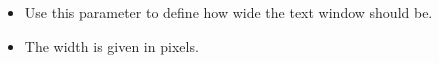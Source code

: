 
\begin{itemize}
\item Use this parameter to define how wide the text window should be. 
\item The width is given in pixels. 
\end{itemize}
